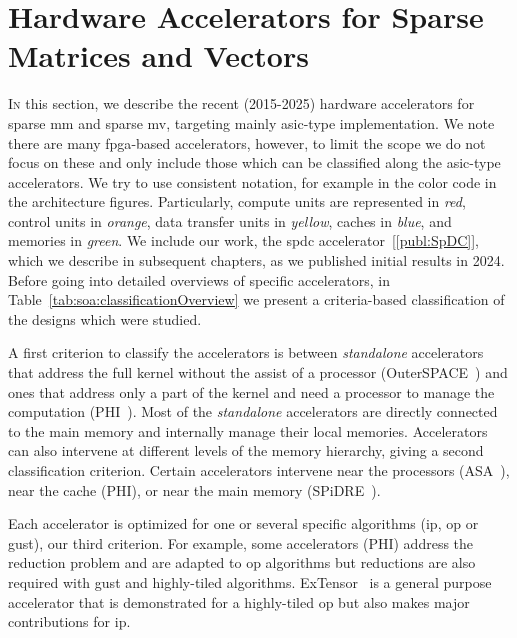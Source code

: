 
\section{Hardware Accelerators for Sparse Matrices and Vectors}
\label{sec:soa:hw_accelerators}

\lettrine{I}{n} this section, we describe the recent (2015-2025) hardware accelerators for sparse \acrfull{mm} and sparse \acrfull{mv}, targeting mainly \acrshort{asic}-type implementation.
We note there are many \acrshort{fpga}-based accelerators, however, to limit the scope we do not focus on these and only include those which can be classified along the \acrshort{asic}-type accelerators.
We try to use consistent notation, for example in the color code in the architecture figures.
Particularly, compute units are represented in \textit{red}, control units in \textit{orange}, data transfer units in \textit{yellow}, caches in \textit{blue}, and memories in \textit{green}.
We include our work, the \acrlong{spdc} accelerator~[\ref{publ:SpDC}], which we describe in subsequent chapters, as we published initial results in 2024.
Before going into detailed overviews of specific accelerators, in Table~\ref{tab:soa:classificationOverview} we present a criteria-based classification of the designs which were studied.

A first criterion to classify the accelerators is between \textit{standalone} accelerators that address the full kernel without the assist of a processor (\ex OuterSPACE~\cite{Pal2018_OuterSPACE}) and ones that address only a part of the kernel and need a processor to manage the computation (\ex PHI~\cite{Mukkara2019_PHI}).
Most of the \textit{standalone} accelerators are directly connected to the main memory and internally manage their local memories.
Accelerators can also intervene at different levels of the memory hierarchy, giving a second classification criterion.
Certain accelerators intervene near the processors (\ex ASA~\cite{Zhang2022_ASA}), near the cache (\ex PHI), or near the main memory (\ex SPiDRE~\cite{Barredo2019_SPiDRE}).

Each accelerator is optimized for one or several specific algorithms (\acrshort{ip}, \acrshort{op} or \acrshort{gust}), our third criterion.
For example, some accelerators (\ex PHI) address the \gls{reduction} problem and are adapted to \acrshort{op} algorithms but \glspl{reduction} are also required with \acrshort{gust} and highly-tiled algorithms.
ExTensor~\cite{Hegde2019_ExTensor} is a general purpose accelerator that is demonstrated for a highly-tiled \acrshort{op} but also makes major contributions for \acrshort{ip}.

